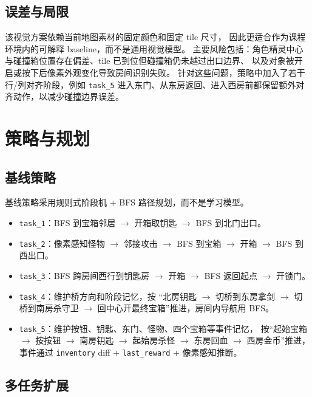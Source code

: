 \documentclass[12pt,a4paper]{ctexart}
\begin{document}
\subsection{误差与局限}

该视觉方案依赖当前地图素材的固定颜色和固定 tile 尺寸，
因此更适合作为课程环境内的可解释 baseline，而不是通用视觉模型。
主要风险包括：角色精灵中心与碰撞箱位置存在偏差、tile 已到位但碰撞箱仍未越过出口边界、
以及对象被开启或按下后像素外观变化导致房间识别失败。
针对这些问题，策略中加入了若干行/列对齐阶段，例如 \texttt{task\_5}
进入东门、从东房返回、进入西房前都保留额外对齐动作，以减少碰撞边界误差。

\section{策略与规划}

\subsection{基线策略}

基线策略采用规则式阶段机 + BFS 路径规划，而不是学习模型。
\begin{itemize}[leftmargin=2em]
  \item \texttt{task\_1}：BFS 到宝箱邻居 \(\rightarrow\) 开箱取钥匙 \(\rightarrow\) BFS 到北门出口。
  \item \texttt{task\_2}：像素感知怪物 \(\rightarrow\) 邻接攻击 \(\rightarrow\) BFS 到宝箱 \(\rightarrow\) 开箱 \(\rightarrow\) BFS 到西出口。
  \item \texttt{task\_3}：BFS 跨房间西行到钥匙房 \(\rightarrow\) 开箱 \(\rightarrow\) BFS 返回起点 \(\rightarrow\) 开锁门。
  \item \texttt{task\_4}：维护桥方向和阶段记忆，按
  “北房钥匙 \(\rightarrow\) 切桥到东房拿剑 \(\rightarrow\) 切桥到南房杀守卫
  \(\rightarrow\) 回中心开最终宝箱”推进，房间内导航用 BFS。
  \item \texttt{task\_5}：维护按钮、钥匙、东门、怪物、四个宝箱等事件记忆，
  按“起始宝箱 \(\rightarrow\) 按按钮 \(\rightarrow\) 南房钥匙
  \(\rightarrow\) 起始房杀怪 \(\rightarrow\) 东房回血 \(\rightarrow\) 西房金币”推进，
  事件通过 \texttt{inventory} diff + \texttt{last\_reward} + 像素感知推断。
\end{itemize}

\subsection{多任务扩展}
\end{document}
